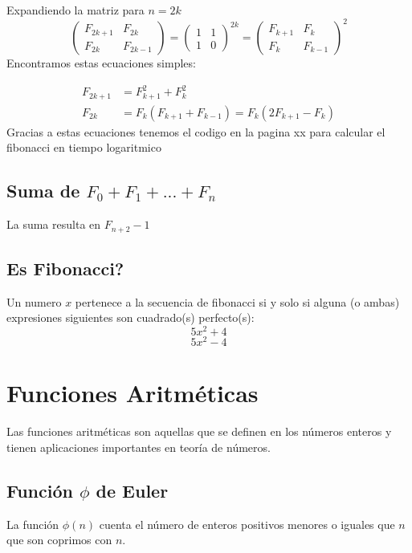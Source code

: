 \documentclass[12pt]{article}
\begin{document}
    Expandiendo la matriz para \(n = 2k\)
    \[
        \begin{pmatrix}
            F_{2k+1} & F_{2k}\\
            F_{2k} & F_{2k-1}
            \end{pmatrix}
            =
            \begin{pmatrix}
            1 & 1\\
            1 & 0
            \end{pmatrix}^{2k}
            =
            \begin{pmatrix}
            F_{k+1} & F_{k}\\
            F_{k} & F_{k-1}
            \end{pmatrix}
            ^2
    \]
    Encontramos estas ecuaciones simples:
    
        \begin{align}
            F_{2k+1} &= F_{k+1}^2 + F_{k}^2 \\
            F_{2k} &= F_k(F_{k+1}+F_{k-1}) = F_k (2F_{k+1} - F_{k})
        \end{align}
    Gracias a estas ecuaciones tenemos el codigo en la pagina xx para calcular el fibonacci en tiempo logaritmico
    \subsection{Suma de \(F_0 + F_1 + ... + F_n\)}
        La suma resulta en \(F_{n+2} - 1\)
    \subsection{Es Fibonacci?}
        Un numero \(x\) pertenece a la secuencia de fibonacci si y solo si alguna (o ambas) expresiones siguientes son cuadrado(s) perfecto(s):
        \[5x^2 +4\]
        \[5x^2 - 4\]
    
\section{Funciones Aritméticas}

Las funciones aritméticas son aquellas que se definen en los números enteros y tienen aplicaciones importantes en teoría de números.

\subsection{Función \(\phi\) de Euler}
La función \(\phi(n)\) cuenta el número de enteros positivos menores o iguales que \( n \) que son coprimos con \( n \).
\end{document}
